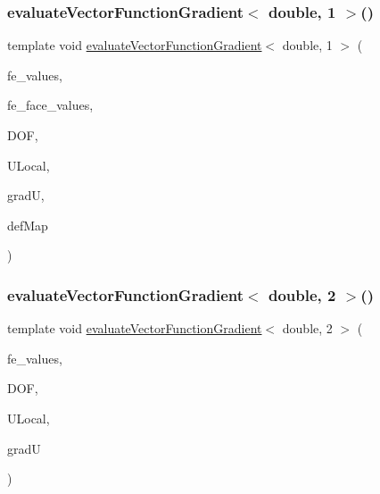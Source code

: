 \mbox{\label{function_evaluations_8cc_a20af37a91c353a81f4d9ad3b2dd678af}} 
\subsubsection{\texorpdfstring{evaluate\+Vector\+Function\+Gradient$<$ double, 1 $>$()}{evaluateVectorFunctionGradient< double, 1 >()}\hspace{0.1cm}{\footnotesize\ttfamily [4/4]}}
{\footnotesize\ttfamily template void \mbox{\hyperlink{group___evaluation_functions_ga9608539d601a91aff1ba01ccc720fbe0}{evaluate\+Vector\+Function\+Gradient}}$<$ double, 1 $>$ (\begin{DoxyParamCaption}\item[{const F\+E\+Values$<$ 1 $>$ \&}]{fe\+\_\+values,  }\item[{const F\+E\+Face\+Values$<$ 1 $>$ \&}]{fe\+\_\+face\+\_\+values,  }\item[{unsigned int}]{D\+OF,  }\item[{Table$<$ 1, double $>$ \&}]{U\+Local,  }\item[{Table$<$ 3, double $>$ \&}]{gradU,  }\item[{\mbox{\hyperlink{structdeformation_map}{deformation\+Map}}$<$ double, 1 $>$ \&}]{def\+Map }\end{DoxyParamCaption})}

\mbox{\label{function_evaluations_8cc_a268d56529013650c702d05cd22cf6148}} 
\subsubsection{\texorpdfstring{evaluate\+Vector\+Function\+Gradient$<$ double, 2 $>$()}{evaluateVectorFunctionGradient< double, 2 >()}\hspace{0.1cm}{\footnotesize\ttfamily [1/4]}}
{\footnotesize\ttfamily template void \mbox{\hyperlink{group___evaluation_functions_ga9608539d601a91aff1ba01ccc720fbe0}{evaluate\+Vector\+Function\+Gradient}}$<$ double, 2 $>$ (\begin{DoxyParamCaption}\item[{const F\+E\+Values$<$ 2 $>$ \&}]{fe\+\_\+values,  }\item[{unsigned int}]{D\+OF,  }\item[{Table$<$ 1, double $>$ \&}]{U\+Local,  }\item[{Table$<$ 3, double $>$ \&}]{gradU }\end{DoxyParamCaption})}

